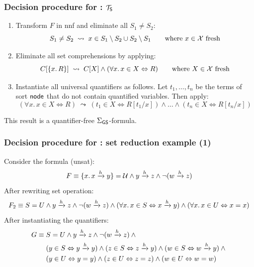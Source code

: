 \documentclass{beamer}
\begin{document}
\begin{frame}
  \frametitle{Decision procedure for \LRJQ: $\mathcal{T}_{\mathsf{S}}$}
    \begin{enumerate}
    \item Transform $F$ in nnf and eliminate all $S_1 \neq S_2$:
    \[S_1 \neq S_2 \; \leadsto \; x \in S_1 \setminus S_2 \cup S_2 \setminus S_1 \qquad \text{where $x \in \mathcal{X}$ fresh}\]

    \item Eliminate all set comprehensions by applying:
      \[C[\{x.\,R\}] \; \leadsto \; C[X] \land (\forall x.\, x \in X \Leftrightarrow R) \qquad \text{where $X \in \mathcal{X}$ fresh}\]

    \item Instantiate all universal quantifiers as follows. Let $t_1,\dots,t_n$ be the terms of sort $\mathsf{node}$ that do not contain quantified variables. Then apply:
    \[(\forall x.\, x \in X \Leftrightarrow R) \; \leadsto \; (t_1 \in X \Leftrightarrow R[t_1/x]) \land \ldots \land  (t_n \in X \Leftrightarrow R[t_n/x])\]
    \end{enumerate}
    This result is a quantifier-free $\Sigma_{\mathsf{GS}}$-formula.
\end{frame}

\begin{frame}
  \frametitle{Decision procedure for \LRJQ: set reduction example (1)}

Consider the \LRJQ formula (unsat):
\[F \equiv \{x.\,x \xrightarrow{h} y\} = \mathcal{U} \land y \xrightarrow{h} z \land \neg (w \xrightarrow{h} z)\]
After rewriting set operation:
{\small
\[
F_2 \equiv S = U \land y \xrightarrow{h} z \land \neg (w \xrightarrow{h} z) \land (\forall x.\, x \in S \Leftrightarrow x \xrightarrow{h} y) \land (\forall x.\, x \in U \Leftrightarrow x = x)
\]
}
After instantiating the quantifiers:
\begin{align*}
G \equiv {} & S = 
U \land y \xrightarrow{h} z \land \neg (w \xrightarrow{h} z) \land {} \\
& (y \in S \Leftrightarrow y \xrightarrow{h} y) \land (z \in S \Leftrightarrow z \xrightarrow{h} y) \land (w \in S \Leftrightarrow w \xrightarrow{h} y) \land {} \\
& (y \in U \Leftrightarrow y = y) \land (z \in U \Leftrightarrow z = z) \land (w \in U \Leftrightarrow w = w)
\end{align*}
\end{frame}
\end{document}
